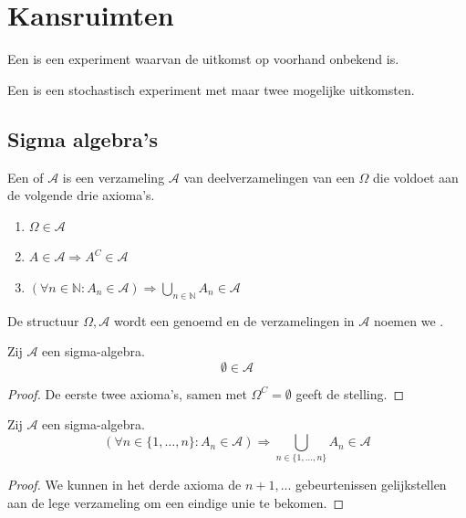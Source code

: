 \documentclass[main.tex]{subfiles}
\begin{document}
\chapter{Kansruimten}
\label{cha:kansruimten}

\begin{de}
  Een  is een experiment waarvan de uitkomst op voorhand onbekend is.
\end{de}

\begin{de}
  Een  is een stochastisch experiment met maar twee mogelijke uitkomsten.
\end{de}
\section{Sigma algebra's}

\begin{de}
  Een  of  $\mathcal{A}$ is een verzameling $\mathcal{A}$ van deelverzamelingen van een  $\Omega$ die voldoet aan de volgende drie axioma's.
  \begin{enumerate}
  \item $\Omega \in \mathcal{A}$
  \item $A\in \mathcal{A} \Rightarrow A^{C} \in \mathcal{A}$
  \item $(\forall n\in \mathbb{N}: A_{n} \in \mathcal{A}) \Rightarrow \bigcup_{n\in \mathbb{N}}A_{n} \in \mathcal{A}$
  \end{enumerate}
  De structuur $\Omega,\mathcal{A}$ wordt een  genoemd en de verzamelingen in $\mathcal{A}$ noemen we .
\end{de}

\begin{st}
  Zij $\mathcal{A}$ een sigma-algebra.
  \[ \emptyset \in \mathcal{A} \]

  \begin{proof}
    De eerste twee axioma's, samen met $\Omega^{C} = \emptyset$ geeft de stelling. 
  \end{proof}
\end{st}

\begin{st}
  \label{st:sigma-algebra-eindige-unie}
  Zij $\mathcal{A}$ een sigma-algebra.
  \[ (\forall n\in \{ 1,\dotsc,n \}: A_{n} \in \mathcal{A}) \Rightarrow \bigcup_{n\in \{1,\dotsc,n\}}A_{n} \in \mathcal{A} \]

  \begin{proof}
    We kunnen in het derde axioma de $n+1,...$ gebeurtenissen gelijkstellen aan de lege verzameling om een eindige unie te bekomen.
  \end{proof}
\end{st}
\end{document}
